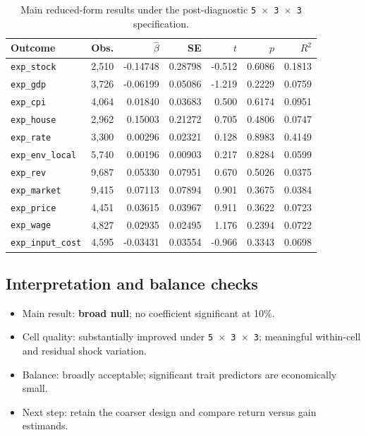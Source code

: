 \documentclass[11pt,letterpaper,english,final]{article}
\begin{document}
\begin{table}[H]
\centering
\small
\setlength{\tabcolsep}{5pt}
\caption{Main reduced-form results under the post-diagnostic \texttt{5 $\times$ 3 $\times$ 3} specification.}
\label{tab:rf_main_results_20260910_postdiag}
\begin{tabular}{lrrrrrr}
\toprule
Outcome & Obs. & $\hat\beta$ & SE & $t$ & $p$ & $R^2$ \\
\midrule
\texttt{exp\_stock}      & 2{,}510 & -0.14748 & 0.28798 & -0.512 & 0.6086 & 0.1813 \\
\texttt{exp\_gdp}        & 3{,}726 & -0.06199 & 0.05086 & -1.219 & 0.2229 & 0.0759 \\
\texttt{exp\_cpi}        & 4{,}064 &  0.01840 & 0.03683 &  0.500 & 0.6174 & 0.0951 \\
\texttt{exp\_house}      & 2{,}962 &  0.15003 & 0.21272 &  0.705 & 0.4806 & 0.0747 \\
\texttt{exp\_rate}       & 3{,}300 &  0.00296 & 0.02321 &  0.128 & 0.8983 & 0.4149 \\
\texttt{exp\_env\_local} & 5{,}740 &  0.00196 & 0.00903 &  0.217 & 0.8284 & 0.0599 \\
\texttt{exp\_rev}        & 9{,}687 &  0.05330 & 0.07951 &  0.670 & 0.5026 & 0.0375 \\
\texttt{exp\_market}     & 9{,}415 &  0.07113 & 0.07894 &  0.901 & 0.3675 & 0.0384 \\
\texttt{exp\_price}      & 4{,}451 &  0.03615 & 0.03967 &  0.911 & 0.3622 & 0.0723 \\
\texttt{exp\_wage}       & 4{,}827 &  0.02935 & 0.02495 &  1.176 & 0.2394 & 0.0722 \\
\texttt{exp\_input\_cost}& 4{,}595 & -0.03431 & 0.03554 & -0.966 & 0.3343 & 0.0698 \\
\bottomrule
\end{tabular}
\end{table}

\subsection{Interpretation and balance checks}

\begin{itemize}
\item Main result: \textbf{broad null}; no coefficient significant at 10\%.
\item Cell quality: substantially improved under \texttt{5 $\times$ 3 $\times$ 3}; meaningful within-cell and residual shock variation.
\item Balance: broadly acceptable; significant trait predictors are economically small.
\item Next step: retain the coarser design and compare return versus gain estimands.
\end{itemize}
\end{document}

